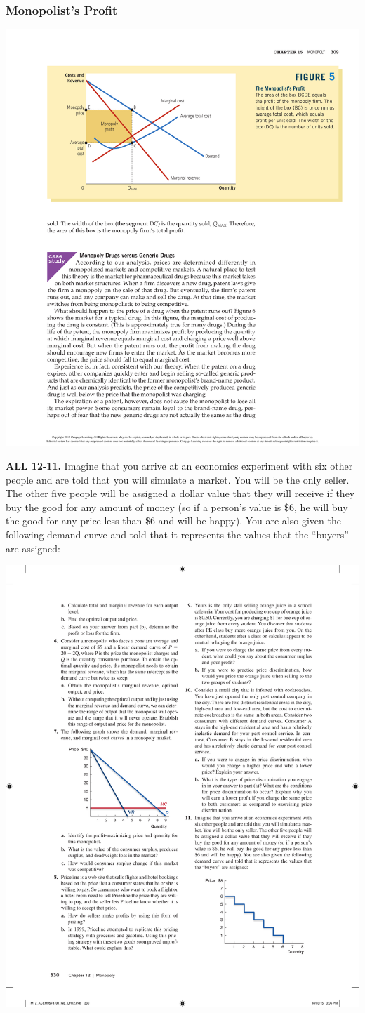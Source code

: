 \documentclass[12pt, xcolor=dvipsnames]{beamer}
\begin{document}
\begin{frame}
\frametitle{\bf Monopolist's Profit}
\begin{center}
\includegraphics[width=.9\linewidth]{figures/profit.pdf}
\end{center}
\end{frame}




\begin{frame}
\small \textsf{\bfseries ALL 12-11.} Imagine that you arrive at an economics experiment with six other people and are told that you will simulate a market. You will be the only seller. The other five people will be assigned a dollar value that they will receive if they buy the good for any amount of money (so if a person's value is \$6, he will buy the good for any price less than \$6 and will be happy). You are also given the following demand curve and told that it represents the values that the ``buyers'' are assigned:
\begin{center}
\includegraphics[width=.5\linewidth]{figures/p11.pdf}
\end{center}
\end{frame}
\end{document}
